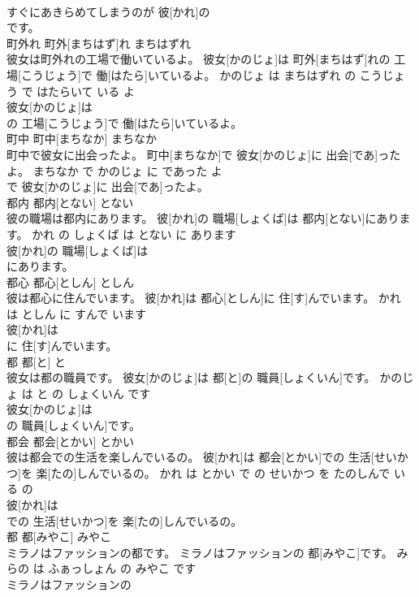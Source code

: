 \documentclass[8pt]{extreport}
\begin{document}
\begin{CJK}{UTF8}{min}
\\	すぐにあきらめてしまうのが 彼[かれ]の
\\	です。			
\\	町外れ	町外[まちはず]れ	まちはずれ	
\\	彼女は町外れの工場で働いているよ。	彼女[かのじょ]は 町外[まちはず]れの 工場[こうじょう]で 働[はたら]いているよ。	かのじょ は まちはずれ の こうじょう で はたらいて いる よ	
\\	彼女[かのじょ]は
\\	の 工場[こうじょう]で 働[はたら]いているよ。			
\\	町中	町中[まちなか]	まちなか	
\\	町中で彼女に出会ったよ。	町中[まちなか]で 彼女[かのじょ]に 出会[であ]ったよ。	まちなか で かのじょ に であった よ	
\\	で 彼女[かのじょ]に 出会[であ]ったよ。			
\\	都内	都内[とない]	とない	
\\	彼の職場は都内にあります。	彼[かれ]の 職場[しょくば]は 都内[とない]にあります。	かれ の しょくば は とない に あります	
\\	彼[かれ]の 職場[しょくば]は
\\	にあります。			
\\	都心	都心[としん]	としん	
\\	彼は都心に住んでいます。	彼[かれ]は 都心[としん]に 住[す]んでいます。	かれ は としん に すんで います	
\\	彼[かれ]は
\\	に 住[す]んでいます。			
\\	都	都[と]	と	
\\	彼女は都の職員です。	彼女[かのじょ]は 都[と]の 職員[しょくいん]です。	かのじょ は と の しょくいん です	
\\	彼女[かのじょ]は
\\	の 職員[しょくいん]です。			
\\	都会	都会[とかい]	とかい	
\\	彼は都会での生活を楽しんでいるの。	彼[かれ]は 都会[とかい]での 生活[せいかつ]を 楽[たの]しんでいるの。	かれ は とかい で の せいかつ を たのしんで いる の	
\\	彼[かれ]は
\\	での 生活[せいかつ]を 楽[たの]しんでいるの。			
\\	都	都[みやこ]	みやこ	
\\	ミラノはファッションの都です。	ミラノはファッションの 都[みやこ]です。	みらの は ふぁっしょん の みやこ です	
\\	ミラノはファッションの

\end{CJK}
\end{document}
